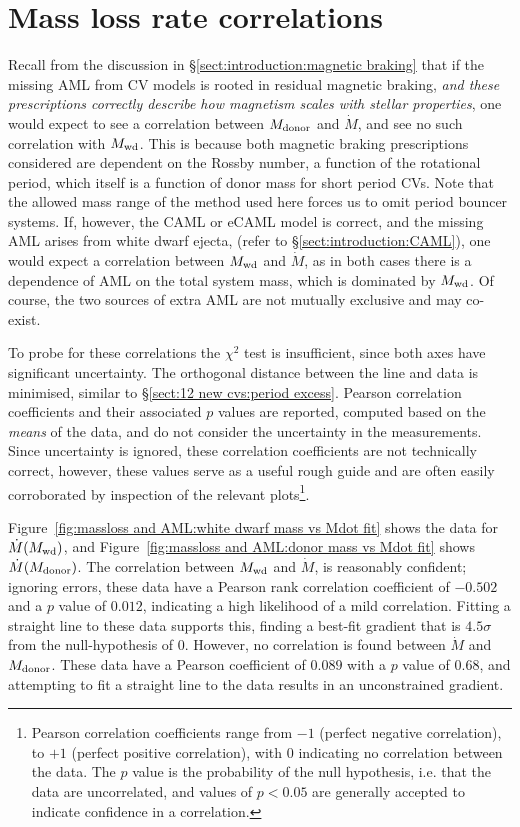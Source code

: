 \newpage
\section{Mass loss rate correlations}
\label{sect:massloss and AML:mass loss rate correlations}

Recall from the discussion in \S\ref{sect:introduction:magnetic braking} that if the missing AML from CV models is rooted in residual magnetic braking, \textit{and these prescriptions correctly describe how magnetism scales with stellar properties}, one would expect to see a correlation between $M_{\rm donor}$ and $\dot M$, and see no such correlation with $M_{\rm wd}$.
This is because both magnetic braking prescriptions considered are dependent on the Rossby number, a function of the rotational period, which itself is a function of donor mass for short period CVs. Note that the allowed mass range of the method used here forces us to omit period bouncer systems.
If, however, the CAML or eCAML model is correct, and the missing AML arises from white dwarf ejecta, (refer to \S\ref{sect:introduction:CAML}), one would expect a correlation between $M_{\rm wd}$ and $\dot M$, as in both cases there is a dependence of AML on the total system mass, which is dominated by $M_{\rm wd}$.
Of course, the two sources of extra AML are not mutually exclusive and may co-exist.

To probe for these correlations the $\chi^2$ test is insufficient, since both axes have significant uncertainty. The orthogonal distance between the line and data is minimised, similar to \S\ref{sect:12 new cvs:period excess}.
Pearson correlation coefficients and their associated $p$ values are reported, computed based on the \textit{means} of the data, and do not consider the uncertainty in the measurements. Since uncertainty is ignored, these correlation coefficients are not technically correct, however, these values serve as a useful rough guide and are often easily corroborated by inspection of the relevant plots\footnote{Pearson correlation coefficients range from $-1$ (perfect negative correlation), to $+1$ (perfect positive correlation), with 0 indicating no correlation between the data. The $p$ value is the probability of the null hypothesis, i.e. that the data are uncorrelated, and values of $p < 0.05$ are generally accepted to indicate confidence in a correlation.}.

Figure~\ref{fig:massloss and AML:white dwarf mass vs Mdot fit} shows the data for $\dot M(M_{\rm wd})$, and Figure~\ref{fig:massloss and AML:donor mass vs Mdot fit} shows $\dot M(M_{\rm donor})$.
The correlation between $M_{\rm wd}$ and $\dot M$, is reasonably confident; ignoring errors, these data have a Pearson rank correlation coefficient of $-0.502$ and a $p$ value of $0.012$, indicating a high likelihood of a mild correlation. Fitting a straight line to these data supports this, finding a best-fit gradient that is $4.5\sigma$ from the null-hypothesis of 0.
However, no correlation is found between $\dot M$ and $M_{\rm donor}$. These data have a Pearson coefficient of $0.089$ with a $p$ value of $0.68$, and attempting to fit a straight line to the data results in an unconstrained gradient.

